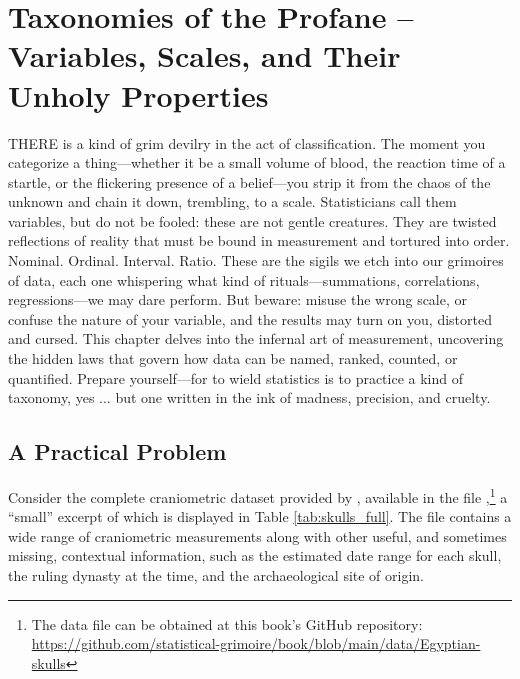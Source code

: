 \chapter{Taxonomies of the Profane – Variables, Scales, and Their Unholy Properties}

\IMFellEnglish
\lettrine[lines=5, realheight]{T}{HERE} is a kind of grim devilry in the act of classification. The moment you categorize a thing—whether it be a small volume of blood, the reaction time of a startle, or the flickering presence of a belief—you strip it from the chaos of the unknown and chain it down, trembling, to a scale. Statisticians call them variables, but do not be fooled: these are not gentle creatures. They are twisted reflections of reality that must be bound in measurement and tortured into order. Nominal. Ordinal. Interval. Ratio. These are the sigils we etch into our grimoires of data, each one whispering what kind of rituals—summations, correlations, regressions—we may dare perform. But beware: misuse the wrong scale, or confuse the nature of your variable, and the results may turn on you, distorted and cursed. This chapter delves into the infernal art of measurement, uncovering the hidden laws that govern how data can be named, ranked, counted, or quantified. Prepare yourself—for to wield statistics is to practice a kind of taxonomy, yes  ... but one written in the ink of madness, precision, and cruelty.

\normalfont

\section{A Practical Problem}

Consider the complete craniometric dataset provided by  \textcite{Thomson1905}, available in the file ,\footnote{The data file can be obtained at this book's GitHub repository: \url{https://github.com/statistical-grimoire/book/blob/main/data/Egyptian-skulls}} a ``small'' excerpt of which is displayed in Table \ref{tab:skulls_full}. The file contains a wide range of craniometric measurements along with other useful, and sometimes missing, contextual information, such as the estimated date range for each skull, the ruling dynasty at the time, and the archaeological site of origin. 

